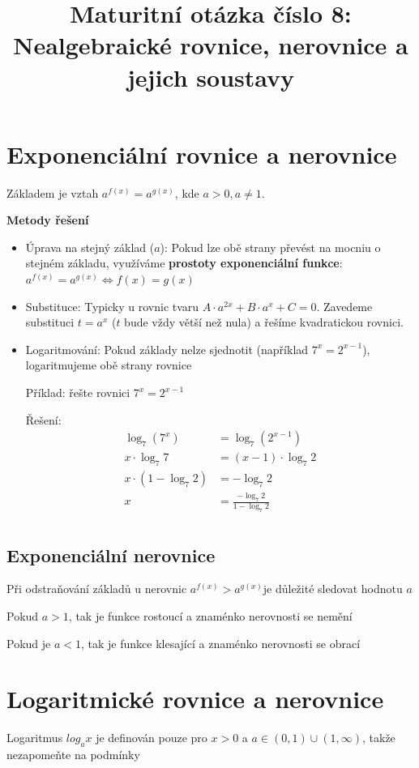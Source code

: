 \documentclass[12pt]{article}
\title{Maturitní otázka číslo 8: Nealgebraické rovnice, nerovnice a jejich soustavy}
\author{}
\date{}
\begin{document}
\maketitle

\section*{Exponenciální rovnice a nerovnice}
Základem je vztah $a^{f(x)} = a^{g(x)}$, kde $a> 0, a\neq 1$.

\textbf{Metody řešení}
\begin{itemize}[itemsep = 2pt]
    \item Úprava na stejný základ ($a$): Pokud lze obě strany převést na mocniu o stejném základu, využíváme \textbf{prostoty exponenciální funkce}: $a^{f(x)} = a^{g(x)} \Leftrightarrow f(x) = g(x)$
    \item Substituce: Typicky u rovnic tvaru $A \cdot a^{2x} + B\cdot a^x + C = 0$. Zavedeme substituci $t = a^x$ ($t$ bude vždy větší než nula) a řešíme kvadratickou rovnici.
    \item Logaritmování: Pokud základy nelze sjednotit (například $7^x = 2^{x-1}$), logaritmujeme obě strany rovnice
    
    Příklad: řešte rovnici $7^x = 2^{x-1}$

    Řešení:
    \begin{align*}
        \log_7 (7^x) &= \log_7 (2^{x-1})\\
        x \cdot \log_7 7 &= (x-1) \cdot \log_7 2\\
        x\cdot (1 - \log_7 2) &= -\log_7 2\\
        x &= \frac{-\log_7 2}{1 - \log_7 2}\\
    \end{align*}
    
\end{itemize}

\subsection*{Exponenciální nerovnice}
Při odstraňování základů u nerovnic $a^{f(x)} > a^{g(x)}$je důležité sledovat hodnotu $a$

Pokud $a>1$, tak je funkce rostoucí a znaménko nerovnosti se nemění

Pokud je $a<1$, tak je funkce klesající a znaménko nerovnosti se obrací

\section*{Logaritmické rovnice a nerovnice}
Logaritmus $log_a x$ je definován pouze pro $x>0$ a $a \in (0,1) \cup (1,\infty)$, takže nezapomeňte na podmínky
\end{document}

